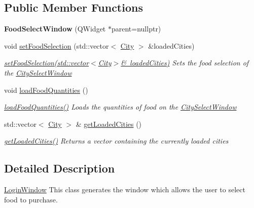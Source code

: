 \subsection*{Public Member Functions}
\begin{DoxyCompactItemize}
\item 
\mbox{\label{class_food_select_window_a406c941abcadeffb28129c9c54f683c7}} 
{\bfseries Food\+Select\+Window} (Q\+Widget $\ast$parent=nullptr)
\item 
void \mbox{\hyperlink{class_food_select_window_a6df884d5b39d16a2708f8bcae205ecd5}{set\+Food\+Selection}} (std\+::vector$<$ \mbox{\hyperlink{class_city}{City}} $>$ \&loaded\+Cities)
\begin{DoxyCompactList}\small\item\em \mbox{\hyperlink{class_food_select_window_a6df884d5b39d16a2708f8bcae205ecd5}{set\+Food\+Selection(std\+::vector$<$\+City$>$\& loaded\+Cities)}} Sets the food selection of the \mbox{\hyperlink{class_city_select_window}{City\+Select\+Window}} \end{DoxyCompactList}\item 
void \mbox{\hyperlink{class_food_select_window_a608403f9ed5796c1a1d0ac034296bc05}{load\+Food\+Quantities}} ()
\begin{DoxyCompactList}\small\item\em \mbox{\hyperlink{class_food_select_window_a608403f9ed5796c1a1d0ac034296bc05}{load\+Food\+Quantities()}} Loads the quantities of food on the \mbox{\hyperlink{class_city_select_window}{City\+Select\+Window}} \end{DoxyCompactList}\item 
std\+::vector$<$ \mbox{\hyperlink{class_city}{City}} $>$ \& \mbox{\hyperlink{class_food_select_window_a2a32ba559351db37a46af24cad9cba5d}{get\+Loaded\+Cities}} ()
\begin{DoxyCompactList}\small\item\em \mbox{\hyperlink{class_food_select_window_a2a32ba559351db37a46af24cad9cba5d}{get\+Loaded\+Cities()}} Returns a vector containing the currently loaded cities \end{DoxyCompactList}\end{DoxyCompactItemize}


\subsection{Detailed Description}
\mbox{\hyperlink{class_login_window}{Login\+Window}} This class generates the window which allows the user to select food to purchase. 

